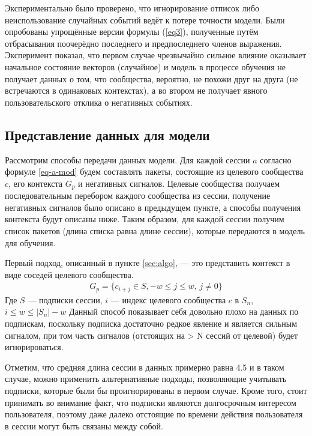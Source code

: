 \documentclass[times,specification,annotation]{itmo-student-thesis}
\begin{document}
Экспериментально было проверено, что игнорирование отписок либо неиспользование случайных событий ведёт к потере точности модели. Были опробованы упрощённые версии формулы (\ref{eq3}), полученные путём отбрасывания
поочерёдно последнего и предпоследнего членов выражения. Эксперимент показал, что первом случае чрезвычайно сильное
влияние оказывает начальное состояние векторов (случайное) и модель в процессе обучения не получает данных о том, что сообщества, вероятно,
не похожи друг на друга (не встречаются в одинаковых контекстах), а во втором не получает явного пользовательского отклика о негативных событиях. 

\subsection{Представление данных для модели}\label{sec:dataf}

Рассмотрим способы передачи данных модели. Для каждой сессии $a$ согласно формуле \ref{eq-a-mod} будем составлять пакеты, состоящие из целевого сообщества $c$, его контекста $G_p$ и негативных сигналов. Целевые сообщества получаем последовательным перебором каждого сообщества из сессии, получение негативных сигналов было описано в предыдущем пункте, а способы получения контекста будут описаны ниже. Таким образом, для каждой сессии получим список пакетов (длина списка равна длине сессии), которые передаются в модель для обучения.

Первый подход, описанный в пункте \ref{sec:algo}, --- это представить контекст в виде соседей целевого сообщества. 
\begin{align}
G_p =\{c_{i + j} \in S, -w \leq j \leq w,\, j \ne 0\} \label{eq4}
\end{align}
Где $S$ --- подписки сессии, $i$ --- индекс целевого сообщества $c$ в $S_n$, $i \leq w \leq |S_n| - w$
Данный способ показывает себя довольно плохо на данных по подпискам, поскольку подписка
достаточно редкое явление и является сильным сигналом, при том часть сигналов
(отстоящих на > N сессий от целевой) будет игнорироваться.

Отметим, что средняя длина сессии в данных примерно равна 4.5 и в таком случае, можно применить альтернативные подходы, позволяющие учитывать подписки, которые были бы проигнорированы в первом случае. Кроме того, стоит принимать во внимание факт, что подписки являются долгосрочным интересом пользователя, поэтому даже далеко отстоящие по времени действия пользователя в сессии могут быть связаны между собой.
\end{document}
